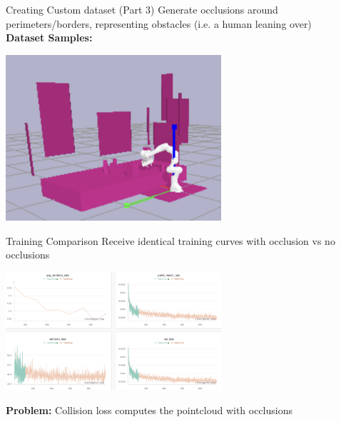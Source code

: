 \documentclass{beamer}
\begin{document}
\begin{frame}[t]{Creating Custom dataset (Part 3)}
    Generate occlusions around perimeters/borders, representing obstacles (i.e. a human leaning over)
    \\
    \textbf{Dataset Samples:}
    \\
    \begin{center}
        \includegraphics[width=0.6\textwidth]{./img/ds_3_0.png}
    \end{center}
\end{frame}


\begin{frame}[t]{Training Comparison}
    Receive identical training curves with occlusion vs no occlusions
    \begin{center}
        \includegraphics[width=0.6\textwidth]{./img/train_cmp_0.png}
    \end{center}
    \pause
    \textbf{Problem:} Collision loss computes the pointcloud with occlusions
\end{frame}
\end{document}
